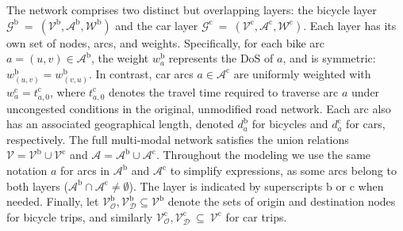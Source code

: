 \documentclass[lettersize,journal]{IEEEtran}
\begin{document}
The network comprises two distinct but overlapping layers: the bicycle layer $\mathcal{G}^\mathrm{b}~=~(\mathcal{V}^\mathrm{b}, \mathcal{A}^\mathrm{b}, \mathcal{W}^\mathrm{b})$ and the car layer $\mathcal{G}^\mathrm{c}~=~(\mathcal{V}^\mathrm{c}, \mathcal{A}^\mathrm{c}, \mathcal{W}^\mathrm{c})$. Each layer has its own set of nodes, arcs, and weights. Specifically, for each bike arc $a = (u, v) \in \mathcal{A}^\mathrm{b}$, the weight $w_a^\mathrm{b}$ represents the DoS of $a$, and is symmetric: $w_{(u,v)}^\mathrm{b} = w_{(v,u)}^\mathrm{b}$. In contrast, car arcs $a \in \mathcal{A}^\mathrm{c}$ are uniformly weighted with $w_a^{\mathrm{c}} = t_{a,0}^{\mathrm{c}}$, where $t_{a,0}^{\mathrm{c}}$ denotes the travel time required to traverse arc $a$ under uncongested conditions in the original, unmodified road network.
Each arc also has an associated geographical length, denoted $d_a^\mathrm{b}$ for bicycles and $d_a^\mathrm{c}$ for cars, respectively. The full multi-modal network satisfies the union relations $\mathcal{V} = \mathcal{V}^\mathrm{b} \cup \mathcal{V}^\mathrm{c}$ and $\mathcal{A} = \mathcal{A}^\mathrm{b} \cup \mathcal{A}^\mathrm{c}$. Throughout the modeling we use the same notation $a$ for arcs in $\mathcal{A}^\mathrm{b}$ and $\mathcal{A}^\mathrm{c}$ to simplify expressions, as some arcs belong to both layers ($\mathcal{A}^\mathrm{b} \cap \mathcal{A}^\mathrm{c} \neq \emptyset$). The layer is indicated by superscripts $\mathrm{b}$ or $\mathrm{c}$ when needed. Finally, let $\mathcal{V}_{\mathcal{O}}^\mathrm{b}, \mathcal{V}_{\mathcal{D}}^\mathrm{b} \subseteq \mathcal{V}^\mathrm{b}$ denote the sets of origin and destination nodes for bicycle trips, and similarly $\mathcal{V}_{\mathcal{O}}^\mathrm{c}, \mathcal{V}_{\mathcal{D}}^\mathrm{c}~\subseteq~\mathcal{V}^\mathrm{c}$ for car trips.
\end{document}
